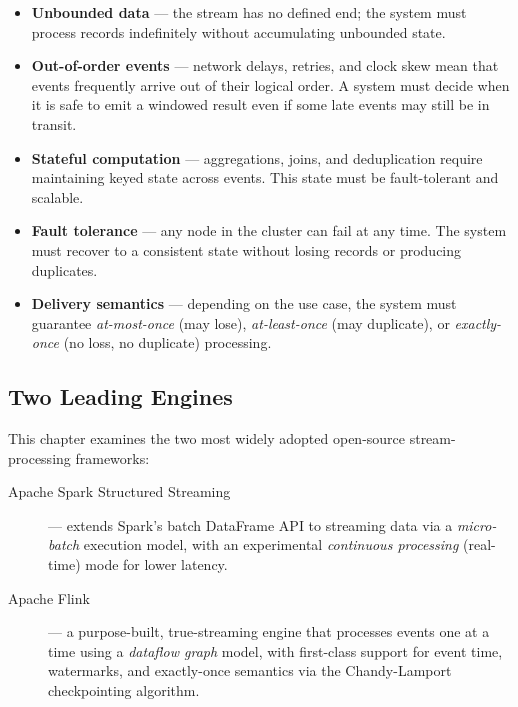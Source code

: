 \begin{itemize}
  \item \textbf{Unbounded data} — the stream has no defined end; the system must process records
        indefinitely without accumulating unbounded state.
  \item \textbf{Out-of-order events} — network delays, retries, and clock skew mean that events
        frequently arrive out of their logical order. A system must decide when it is safe to
        emit a windowed result even if some late events may still be in transit.
  \item \textbf{Stateful computation} — aggregations, joins, and deduplication require maintaining
        keyed state across events. This state must be fault-tolerant and scalable.
  \item \textbf{Fault tolerance} — any node in the cluster can fail at any time.
        The system must recover to a consistent state without losing records or producing duplicates.
  \item \textbf{Delivery semantics} — depending on the use case, the system must guarantee
        \emph{at-most-once} (may lose), \emph{at-least-once} (may duplicate), or
        \emph{exactly-once} (no loss, no duplicate) processing.
\end{itemize}

\subsection{Two Leading Engines}

This chapter examines the two most widely adopted open-source stream-processing frameworks:

\begin{description}
  \item[Apache Spark Structured Streaming] — extends Spark's batch DataFrame API to streaming data
        via a \emph{micro-batch} execution model, with an experimental \emph{continuous processing}
        (real-time) mode for lower latency.
  \item[Apache Flink] — a purpose-built, true-streaming engine that processes events one at a time
        using a \emph{dataflow graph} model, with first-class support for event time, watermarks,
        and exactly-once semantics via the Chandy-Lamport checkpointing algorithm.
\end{description}
